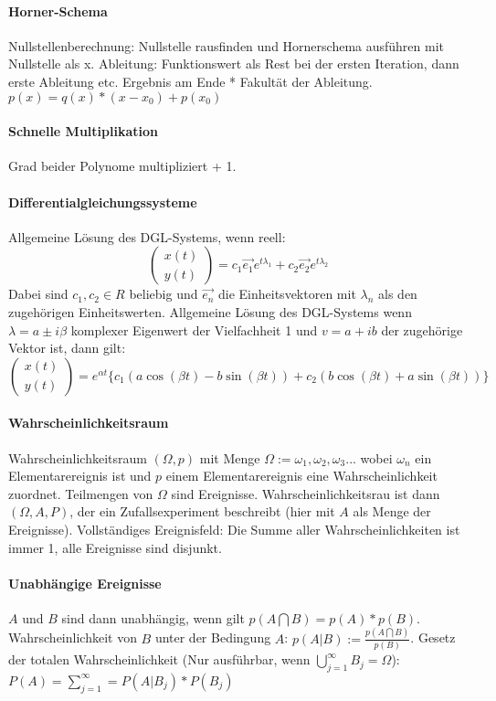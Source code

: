 \documentclass[12pt,landscape]{article}
\begin{document}
\begin{multicols}{3}
\paragraph{Horner-Schema} Nullstellenberechnung: Nullstelle rausfinden und Hornerschema ausführen mit Nullstelle als x. Ableitung: Funktionswert als Rest bei der ersten Iteration, dann erste Ableitung etc. Ergebnis am Ende * Fakultät der Ableitung. $p(x) = q(x) * (x - x_0) + p(x_0)$
\paragraph{Schnelle Multiplikation} Grad beider Polynome multipliziert + 1.
\paragraph{Differentialgleichungssysteme} Allgemeine Lösung des DGL-Systems, wenn reell:
\[
\begin{pmatrix}
x(t) \\
y(t)
\end{pmatrix} = c_1 \vec{e_1} e^{t{\lambda}_1} + c_2 \vec{e_2} e^{t{\lambda}_2}
\]
Dabei sind $c_1, c_2 \in R$ beliebig und $\vec{e_n}$ die Einheitsvektoren mit ${\lambda}_n$ als den zugehörigen Einheitswerten. 
Allgemeine Lösung des DGL-Systems wenn $\lambda = a \pm i \beta$ komplexer Eigenwert der Vielfachheit 1 und $v = a + ib$ der zugehörige Vektor ist, dann gilt:
\[
\begin{pmatrix}
x(t) \\
y(t)
\end{pmatrix} = e^{\alpha t} \{  c_1 (a \cos(\beta t) - b \sin(\beta t)) + c_2 (b \cos(\beta t) + a \sin (\beta t))
\} 
\]
\paragraph{Wahrscheinlichkeitsraum} Wahrscheinlichkeitsraum $(\Omega, p)$ mit Menge $\Omega := {\omega_1, \omega_2, \omega_3...}$ wobei $\omega_n$ ein Elementarereignis ist und $p$ einem Elementarereignis eine Wahrscheinlichkeit zuordnet. Teilmengen von $\Omega$ sind Ereignisse. Wahrscheinlichkeitsrau ist dann $(\Omega, A, P)$, der ein Zufallsexperiment beschreibt (hier mit $A$ als Menge der Ereignisse). Vollständiges Ereignisfeld: Die Summe aller Wahrscheinlichkeiten ist immer 1, alle Ereignisse sind disjunkt.
\paragraph{Unabhängige Ereignisse} $A$ und $B$ sind dann unabhängig, wenn gilt $p(A \bigcap B) = p(A) * p(B)$. Wahrscheinlichkeit von $B$ unter der Bedingung $A$: $p(A|B) := \frac{p(A \bigcap B)}{p(B)}$. Gesetz der totalen Wahrscheinlichkeit (Nur ausführbar, wenn $\bigcup^{\infty}_{j=1} B_j = \Omega$): $P(A) = \sum_{j=1}^{\infty} = P(A|B_j) * P(B_j)$

\end{multicols}
\end{document}
